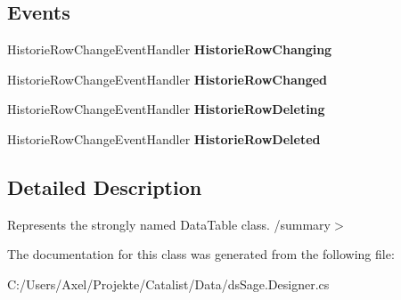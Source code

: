 \subsection*{Events}
\begin{DoxyCompactItemize}
\item 
Historie\+Row\+Change\+Event\+Handler {\bfseries Historie\+Row\+Changing}\hypertarget{class_products_1_1_data_1_1ds_sage_1_1_historie_data_table_ac5006c416eb5fb984d1ea7efcc76744d}{}\label{class_products_1_1_data_1_1ds_sage_1_1_historie_data_table_ac5006c416eb5fb984d1ea7efcc76744d}

\item 
Historie\+Row\+Change\+Event\+Handler {\bfseries Historie\+Row\+Changed}\hypertarget{class_products_1_1_data_1_1ds_sage_1_1_historie_data_table_a3d3b40320f56e744765d7a38980fad16}{}\label{class_products_1_1_data_1_1ds_sage_1_1_historie_data_table_a3d3b40320f56e744765d7a38980fad16}

\item 
Historie\+Row\+Change\+Event\+Handler {\bfseries Historie\+Row\+Deleting}\hypertarget{class_products_1_1_data_1_1ds_sage_1_1_historie_data_table_a87f23d08704586e00e5639a06feb3a73}{}\label{class_products_1_1_data_1_1ds_sage_1_1_historie_data_table_a87f23d08704586e00e5639a06feb3a73}

\item 
Historie\+Row\+Change\+Event\+Handler {\bfseries Historie\+Row\+Deleted}\hypertarget{class_products_1_1_data_1_1ds_sage_1_1_historie_data_table_a2c9dc89aa127df5e8a470482d7ffbe6c}{}\label{class_products_1_1_data_1_1ds_sage_1_1_historie_data_table_a2c9dc89aa127df5e8a470482d7ffbe6c}

\end{DoxyCompactItemize}


\subsection{Detailed Description}
Represents the strongly named Data\+Table class. /summary$>$ 

The documentation for this class was generated from the following file\+:\begin{DoxyCompactItemize}
\item 
C\+:/\+Users/\+Axel/\+Projekte/\+Catalist/\+Data/ds\+Sage.\+Designer.\+cs\end{DoxyCompactItemize}
